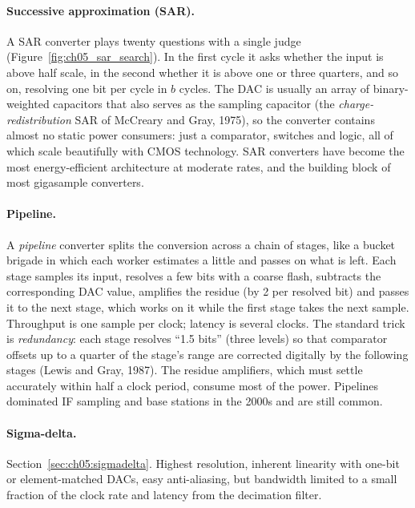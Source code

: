 \paragraph{Successive approximation (SAR).} A SAR converter plays twenty questions with a single
judge (Figure~\ref{fig:ch05_sar_search}). In the first cycle it asks whether the input is above
half scale, in the second whether it is above one or three quarters, and so on, resolving one bit
per cycle in $b$ cycles. The DAC is usually an array of binary-weighted capacitors that also serves
as the sampling capacitor (the \emph{charge-redistribution} SAR of McCreary and Gray, 1975), so the
converter contains almost no static power consumers: just a comparator, switches and logic,
all of which scale beautifully with CMOS technology. SAR converters have become the most
energy-efficient architecture at moderate rates, and the building block of most gigasample
converters.


\paragraph{Pipeline.} A \emph{pipeline} converter splits the conversion across a chain of
stages, like a bucket brigade in which each worker estimates a little and passes on what is left.
Each stage samples its input, resolves a few bits with a coarse flash, subtracts the
corresponding DAC value, amplifies the residue (by 2 per resolved bit) and passes it to the next
stage, which works on it while the first stage takes the next sample. Throughput is one sample
per clock; latency is several clocks. The standard trick is \emph{redundancy}: each stage
resolves ``1.5 bits'' (three levels) so that comparator offsets up to a quarter of the stage's
range are corrected digitally by the following stages (Lewis and Gray, 1987). The residue
amplifiers, which must settle accurately within half a clock period, consume most of the power.
Pipelines dominated IF sampling and base stations in the 2000s and are still common.

\paragraph{Sigma-delta.} Section~\ref{sec:ch05:sigmadelta}. Highest resolution, inherent
linearity with one-bit or element-matched DACs, easy anti-aliasing, but bandwidth limited to a
small fraction of the clock rate and latency from the decimation filter.

